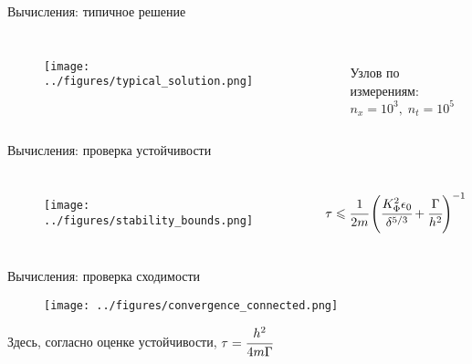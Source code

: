 \documentclass[aspectratio=169]{beamer}
\begin{document}
\begin{frame}{Вычисления: типичное решение}
\vspace{-0.4cm}
\begin{columns}
\begin{figure}
	\texttt{[image: ../figures/typical\_solution.png]}
\end{figure}
\hfill \\
\vspace{3.5cm}
\hspace{-2.5cm}
Узлов по измерениям: \\
\hspace{-2.5cm}
$n_x = 10^3, \; n_t = 10^5$
\end{columns}
\end{frame}


\begin{frame}{Вычисления: проверка устойчивости}
\vspace{-0.4cm}
\begin{columns}
\begin{figure}
	\texttt{[image: ../figures/stability\_bounds.png]}
\end{figure}
$$\tau \leqslant \cfrac{1}{2m} \left( \cfrac{K_\Phi^2 \epsilon_0}{\delta^{5/3}} +
\cfrac{\Gamma}{h^2} \right)^{-1}$$
\end{columns}
\end{frame}


\begin{frame}{Вычисления: проверка сходимости}
\vspace{-0.3cm}
\begin{figure}
	\texttt{[image: ../figures/convergence\_connected.png]}
\end{figure}
\vspace{-0.6cm}
\begin{center}
	Здесь, согласно оценке устойчивости, $\tau = \cfrac{h^2}{4m \Gamma}$
\end{center}
\end{frame}
\end{document}
